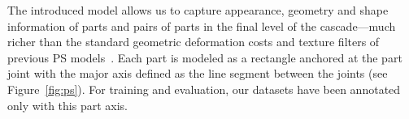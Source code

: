 The introduced \CPS model allows us to capture appearance, geometry and shape information of parts and pairs of parts in the final level of the cascade---much richer than the standard geometric deformation costs and texture filters of previous PS models~\cite{felz05,devacrf,ferrari08,andriluka09}.  
Each part is modeled as a rectangle anchored at the part joint with the major axis defined as the line segment between the joints (see Figure~\ref{fig:ps}).  For training and evaluation, our datasets have been annotated only with this part axis.



